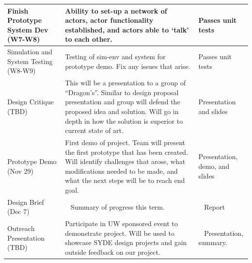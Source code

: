 \documentclass{report}
\begin{document}
\begin{longtable}[htbp] {| P{2.5cm} | P{10cm} | P{2.5cm} |}
    Finish Prototype System Dev (W7-W8)        & Ability to set-up a network of actors, actor functionality established, and actors able to `talk' to each other.                                                                                                                                                                                                                                                                           & Passes unit tests                                  \\ \hline
    Simulation and System Testing (W8-W9)      & Testing of sim-env and system for prototype demo. Fix any issues that arise.                                                                                                                                                                                                                                                                                                               & Passes unit tests                                  \\ \hline
    Design Critique (TBD)                      & This will be a presentation to a group of ``Dragon's''. Similar to design proposal presentation and group will defend the proposed idea and solution. Will go in depth in how the solution is superior to current state of art.                                                                                                                                                              & Presentation and slides                            \\ \hline
    Prototype Demo (Nov 29)                    & First demo of project. Team will present the first prototype that has been created. Will identify challenges that arose, what modifications needed to be made, and what the next steps will be to reach end goal.                                                                                                                                                                          & Presentation, demo, and slides                     \\ \hline
    Design Brief (Dec 7)                       & ~        Summary of progress this term.                                                                                                                                                                                                                                                                                                                                                                                   & ~           Report                                       \\ \hline
    Outreach Presentation (TBD)                & Participate in UW sponsored event to demonstrate project. Will be used to showcase SYDE design projects and gain outside feedback on our project.                                                                                                                                                                                                                                          & ~                     Presentation, summary.                             \\ \hline


\end{longtable}
\end{document}
